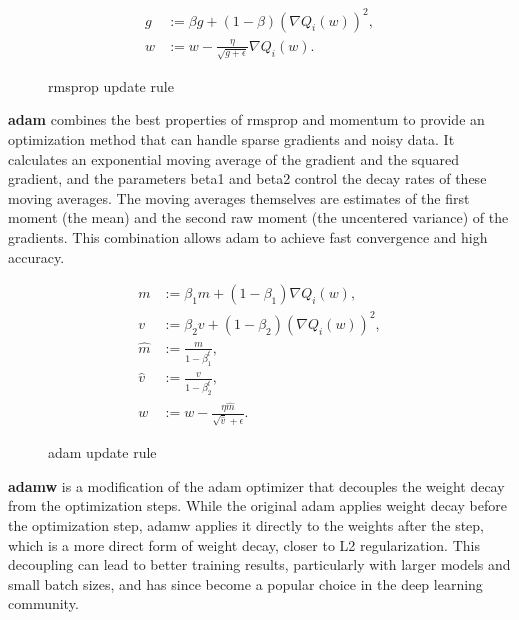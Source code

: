 \begin{figure}[H]
    \begin{align*}
        g & := \beta g + (1 - \beta) (\nabla Q_i(w))^2,            \\
        w & := w - \frac{\eta}{\sqrt{g + \epsilon}} \nabla Q_i(w).
    \end{align*}
    \caption{\gls{rmsprop} update rule}
\end{figure}

\textbf{\gls{adam}} combines the best properties of \gls{rmsprop} and
momentum to provide an optimization method that can handle sparse gradients and
noisy data. It calculates an exponential moving average of the gradient and the
squared gradient, and the parameters beta1 and beta2 control the decay rates of
these moving averages. The moving averages themselves are estimates of the
first moment (the mean) and the second raw moment (the uncentered variance) of
the gradients. This combination allows \gls{adam} to achieve fast convergence and
high accuracy.

\begin{figure}[H]
    \begin{align*}
        m       & := \beta_1 m + (1 - \beta_1) \nabla Q_i(w),            \\
        v       & := \beta_2 v + (1 - \beta_2) (\nabla Q_i(w))^2,        \\
        \hat{m} & := \frac{m}{1 - \beta_1^t},                            \\
        \hat{v} & := \frac{v}{1 - \beta_2^t},                            \\
        w       & := w - \frac{\eta \hat{m}}{\sqrt{\hat{v}} + \epsilon}.
    \end{align*}
    \caption{\gls{adam} update rule}
\end{figure}

\textbf{\gls{adamw}} is a modification of the \gls{adam} optimizer that decouples the weight decay
from the optimization steps. While the original \gls{adam} applies weight decay
before the optimization step, \gls{adamw} applies it directly to the weights after
the step, which is a more direct form of weight decay, closer to L2
regularization. This decoupling can lead to better training results,
particularly with larger models and small batch sizes, and has since become a
popular choice in the deep learning community.

